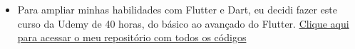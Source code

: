 \begin{itemize}
\item Para ampliar minhas habilidades com Flutter e Dart, eu decidi fazer este curso da Udemy de 40 horas, do básico ao avançado do Flutter.
\hyperlink{https://github.com/GustavoLR548/MeusAPPsFlutter}{Clique aqui para acessar o meu repositório com todos os códigos}
\end{itemize}
\smallskip




\cvproject{}